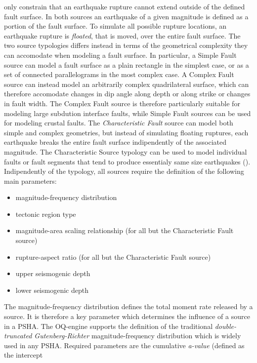 only constrain that an earthquake rupture cannot extend outside of the defined fault surface. In both sources an earthquake of a given magnitude is defined as a portion of the fault surface. To simulate all possible rupture locations, an earthquake rupture is \textit{floated}, that is moved, over the entire fault surface. The two source typologies differs instead in terms of the geometrical complexity they can accomodate when modeling a fault surface. In particular, a Simple Fault source can model a fault surface as a plain rectangle in the simplest case, or as a set of connected parallelograms in the most complex case. A Complex Fault source can instead model an arbitrarily complex quadrilateral surface, which can therefore accomodate changes in dip angle along depth or along strike or changes in fault width. The Complex Fault source is therefore particularly suitable for modeling large subdution interface faults, while Simple Fault sources can be used for modeling crustal faults. The \textit{Characteristic Fault} source can model both simple and complex geometries, but instead of simulating floating ruptures, each earthquake breaks the entire fault surface indipendently of the associated magnitude. The Characteristic Source typology can be used to model individual faults or fault segments that tend to produce essentialy same size earthquakes (\cite{schwartscoppersmith1984}).\\
Indipendently of the typology, all sources require the definition of the following main parameters:
\begin{itemize}
\item magnitude-frequency distribution
\item tectonic region type
\item magnitude-area scaling relationship (for all but the Characteristic Fault source)
\item rupture-aspect ratio (for all but the Characteristic Fault source)
\item upper seismogenic depth
\item lower seismogenic depth
\end{itemize}
The magnitude-frequency distribution defines the total moment rate released by a source. It is therefore a
key parameter which determines the influence of a source in a PSHA. The OQ-engine supports the definition
of the traditional \textit{double-truncated Gutenberg-Richter} magnitude-frequency distribution which is
widely used in any PSHA. Required parameters are the cumulative \textit{a-value} (defined as the intercept
